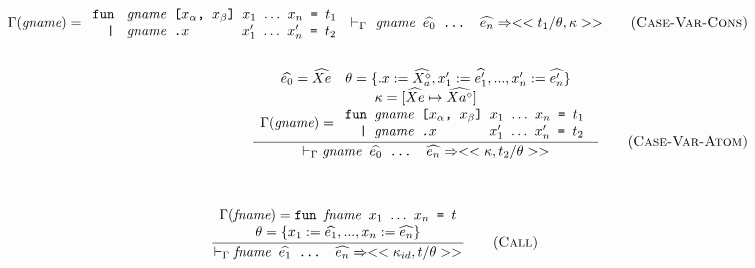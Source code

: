 \documentclass[10pt]{../sigplanconf}
\newcommand{\nfrac}[2]{\frac{\displaystyle{#1}}{\displaystyle{#2}}}
\newcommand{\tagsc}[1]{\tag{\scshape #1}}
\begin{document}
\begin{figure}
\begin{align}
{\begin{array}{c}
        \Gamma(\textit{gname}) =
        \begin{array}{l}
          \texttt{fun \textit{\rmfamily gname} [$x_\alpha$, $x_\beta$] $x_1$ $\ldots$ $x_n$ = $t_1$} \\
          \texttt{\ \ | \textit{\rmfamily gname}\ \texttt{.}$x$ \hspace{0.95cm} $x_1'$ $\ldots$ $x_n'$ = $t_2$} \\
        \end{array}
      \end{array}
    }{
      |-_\Gamma \texttt{\textit{\rmfamily gname} $\widehat{e_0}$ ... $\widehat{e_n}$} => <<t_1 / \theta, \kappa>>
    } \tagsc{Case-Var-Cons}
\\\nonumber\\
    \nfrac{
      \begin{array}{c}
        \widehat{e_0} = \widehat{Xe} \quad \theta = \{ .x := \widehat{X_{a}^\diamond}, x_1' := \widehat{e_1'}, ..., x_n' := \widehat{e_n'} \} \\
        \kappa = [\widehat{Xe} \mapsto \widehat{Xa^\diamond}] \\
        \Gamma(\textit{gname}) =
        \begin{array}{l}
          \texttt{fun \textit{\rmfamily gname} [$x_\alpha$, $x_\beta$] $x_1$ $\ldots$ $x_n$ = $t_1$} \\
          \texttt{\ \ | \textit{\rmfamily gname}\ \texttt{.}$x$ \hspace{0.95cm} $x_1'$ $\ldots$ $x_n'$ = $t_2$} \\
        \end{array}
      \end{array}
    }{
      |-_\Gamma \texttt{\textit{\rmfamily gname} $\widehat{e_0}$ ... $\widehat{e_n}$} => <<\kappa, t_2 / \theta>>
    } \tagsc{Case-Var-Atom}
  \end{align}

  ~\newline

  \begin{equation}
    \nfrac{
      \begin{array}{c}
        \Gamma(\textit{fname}) =
          \texttt{fun \textit{\rmfamily fname} $x_1$ $\ldots$ $x_n$ = $t$} \\
        \theta = \{ x_1 := \widehat{e_1}, ..., x_n := \widehat{e_n} \}
      \end{array}
    }{
      |-_\Gamma \texttt{\textit{\rmfamily fname} $\widehat{e_1}$ ... $\widehat{e_n}$} => << \kappa_{id}, t / \theta>>
    } \tagsc{Call}
  \end{equation}


\end{figure}
\end{document}
